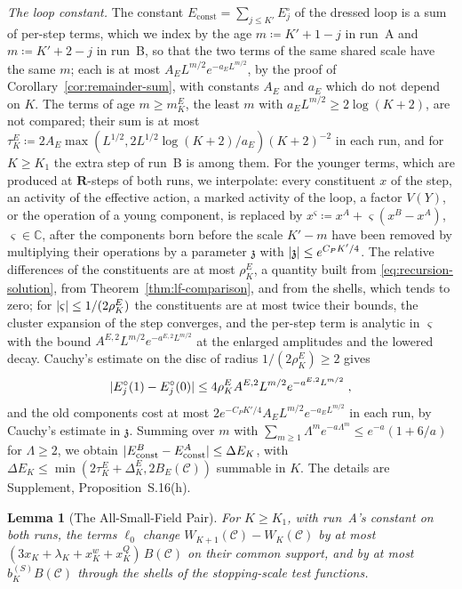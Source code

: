 \documentclass[11pt]{preprint}
\DeclarePairedDelimiter{\abs}{\lvert}{\rvert}
\numberwithin{equation}{section}
\newtheorem{lemma}[theorem]{Lemma}
\theoremstyle{definition}
\theoremstyle{remark}
\theoremstyle{plain}
\begin{document}
\emph{The loop constant.} The constant $E_{\mathrm{const}} = \sum_{j \leq K'}E^\circ_j$ of the dressed loop is a sum of per-step terms, which we index by the age $m \coloneqq K' + 1 - j$ in run~A and $m \coloneqq K' + 2 - j$ in run~B, so that the two terms of the same shared scale have the same $m$; each is at most $A_EL^{m/2}e^{-a_EL^{m/2}}$, by the proof of Corollary~\ref{cor:remainder-sum}, with constants $A_E$ and $a_E$ which do not depend on $K$. The terms of age $m \geq m^E_K$, the least $m$ with $a_EL^{m/2} \geq 2\log(K + 2)$, are not compared; their sum is at most $\tau^E_K \coloneqq 2A_E\max(L^{1/2}, 2L^{1/2}\log(K + 2)/a_E)(K + 2)^{-2}$ in each run, and for $K \geq K_1$ the extra step of run~B is among them. For the younger terms, which are produced at $\mathbf R$-steps of both runs, we interpolate: every constituent $x$ of the step, an activity of the effective action, a marked activity of the loop, a factor $V(Y)$, or the operation of a young component, is replaced by $x^\varsigma \coloneqq x^A + \varsigma(x^B - x^A)$, $\varsigma \in \mathbb C$, after the components born before the scale $K' - m$ have been removed by multiplying their operations by a parameter $\mathfrak z$ with $\abs{\mathfrak z} \leq e^{C_PK'/4}$. The relative differences of the constituents are at most $\rho^E_K$, a quantity built from \eqref{eq:recursion-solution}, from Theorem~\ref{thm:lf-comparison}, and from the shells, which tends to zero; for $\abs{\varsigma} \leq 1/(2\rho^E_K)$ the constituents are at most twice their bounds, the cluster expansion of the step converges, and the per-step term is analytic in $\varsigma$ with the bound $A^{E,2}L^{m/2}e^{-a^{E,2}L^{m/2}}$ at the enlarged amplitudes and the lowered decay. Cauchy's estimate on the disc of radius $1/(2\rho^E_K) \geq 2$ gives
\begin{equation}\label{eq:loop-constant-difference}
    \abs{E^\circ_j(1) - E^\circ_j(0)} \leq 4\rho^E_KA^{E,2}L^{m/2}e^{-a^{E,2}L^{m/2}}\;,
\end{equation}
and the old components cost at most $2e^{-C_PK'/4}A_EL^{m/2}e^{-a_EL^{m/2}}$ in each run, by Cauchy's estimate in $\mathfrak z$. Summing over $m$ with $\sum_{m \geq 1}\Lambda^me^{-a\Lambda^m} \leq e^{-a}(1 + 6/a)$ for $\Lambda \geq 2$, we obtain $\abs{E^B_{\mathrm{const}} - E^A_{\mathrm{const}}} \leq \Delta E_K$, with $\Delta E_K \leq \min(2\tau^E_K + \Delta^E_K, 2B_E(\mathcal C))$ summable in $K$. The details are Supplement, Proposition~S.16(h).

\begin{lemma}[The All-Small-Field Pair]\label{lem:trivial-pair}
For $K \geq K_1$, with run~A's constant on both runs, the terms $\ell_0$ change $W_{K+1}(\mathcal C) - W_K(\mathcal C)$ by at most $(3x_K + \lambda_K + x^w_K + x^Q_K)\,B(\mathcal C)$ on their common support, and by at most $b^{(S)}_KB(\mathcal C)$ through the shells of the stopping-scale test functions.
\end{lemma}
\end{document}
